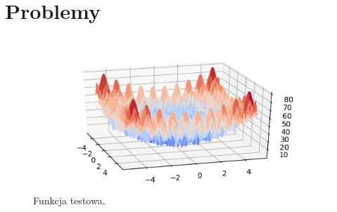 \pagebreak
\section{Problemy}

\begin{figure}
	\centering
	\includegraphics[width=\linewidth]{imgs/rastrigin_plot}
	\caption{Funkcja testowa.}
	\label{fig:rastrigin_plot}
\end{figure}

%
%
%
